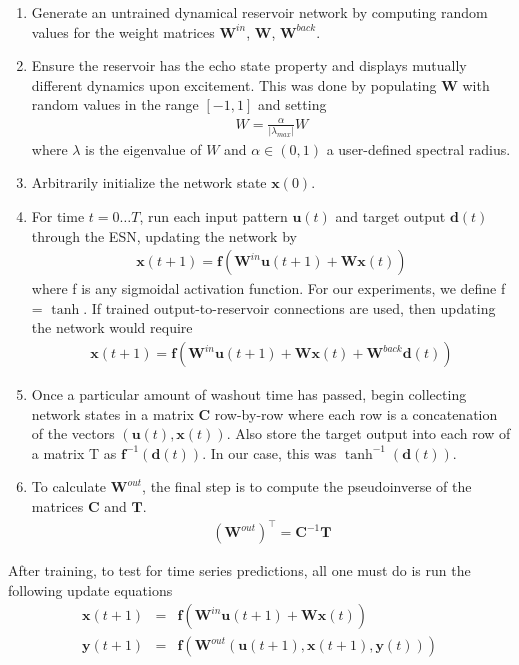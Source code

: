 \documentclass{acm_proc_article-sp}
\renewcommand{\vec}[1]{\mathbf{#1}}
\begin{document}
\begin{enumerate}
\item Generate an untrained dynamical reservoir network by computing random values for the weight matrices $\vec{W}^{in}$, $\vec{W}$, $\vec{W}^{back}$.
\item Ensure the reservoir has the echo state property and displays mutually different dynamics upon excitement. This was done by populating $\vec{W}$ with random values in the range $[-1, 1]$ and setting
\begin{eqnarray*}
W = \frac{\alpha}{|\lambda_{max}|} W
\end{eqnarray*}
where $\lambda$ is the eigenvalue of $W$ and $\alpha \in (0,1)$ a user-defined spectral radius.
\item Arbitrarily initialize the network state $\vec{x}(0)$.
\item For time $t = 0 \ldots T$, run each input pattern $\vec{u}(t)$ and target output $\vec{d}(t)$ through the ESN, updating the network by
\begin{eqnarray*}
\vec{x}(t+1) = \vec{f}(\vec{W}^{in} \vec{u}(t+1) + \vec{W} \vec{x}(t))
\end{eqnarray*}
where f is any sigmoidal activation function. For our experiments, we define f = $\tanh$. If trained output-to-reservoir connections are used, then updating the network would require
\begin{eqnarray*}
\vec{x}(t+1) = \vec{f}(\vec{W}^{in} \vec{u}(t+1) + \vec{W} \vec{x}(t) + \vec{W}^{back} \vec{d}(t))
\end{eqnarray*}
\item Once a particular amount of washout time has passed, begin collecting network states in a matrix $\vec{C}$ row-by-row where each row is a concatenation of the vectors $(\vec{u}(t), \vec{x}(t))$. Also store the target output into each row of a matrix T as $\vec{f}^{-1}(\vec{d}(t))$. In our case, this was $\tanh^{-1}(\vec{d}(t))$.
\item To calculate $\vec{W}^{out}$, the final step is to compute the pseudoinverse of the matrices $\vec{C}$ and $\vec{T}$.
\begin{eqnarray*}
(\vec{W}^{out})^\top = \vec{C}^{-1} \vec{T}
\end{eqnarray*}
\end{enumerate}

After training, to test for time series predictions, all one must do is run the following update equations
\begin{eqnarray*}
\vec{x}(t+1) &=& \vec{f}(\vec{W}^{in} \vec{u}(t+1) + \vec{W} \vec{x}(t)) \\
\vec{y}(t+1) &=& \vec{f}(\vec{W}^{out} (\vec{u}(t+1), \vec{x}(t+1), \vec{y}(t))) \\
\end{eqnarray*}
\end{document}
